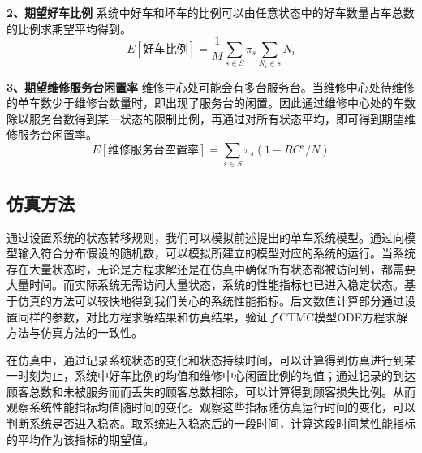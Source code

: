 \documentclass{article}
\begin{document}
\textbf{2、期望好车比例}
系统中好车和坏车的比例可以由任意状态中的好车数量占车总数的比例求期望平均得到。
\begin{equation}
    E[\mbox{好车比例}] = \frac{1}{M} \sum \limits _{s \in S} \pi_{s} \sum \limits _{N_i \in s} N_i 
\end{equation}

\textbf{3、期望维修服务台闲置率}
维修中心处可能会有多台服务台。当维修中心处待维修的单车数少于维修台数量时，即出现了服务台的闲置。因此通过维修中心处的车数除以服务台数得到某一状态的限制比例，再通过对所有状态平均，即可得到期望维修服务台闲置率。
\begin{equation}
E[\mbox{维修服务台空置率}] = \sum \limits _{s \in S} \pi_{s} (1 - RC^s / N)
\end{equation}


\subsection{仿真方法}
通过设置系统的状态转移规则，我们可以模拟前述提出的单车系统模型。通过向模型输入符合分布假设的随机数，可以模拟所建立的模型对应的系统的运行。当系统存在大量状态时，无论是方程求解还是在仿真中确保所有状态都被访问到，都需要大量时间。而实际系统无需访问大量状态，系统的性能指标也已进入稳定状态。基于仿真的方法可以较快地得到我们关心的系统性能指标。后文数值计算部分通过设置同样的参数，对比方程求解结果和仿真结果，验证了CTMC模型ODE方程求解方法与仿真方法的一致性。

在仿真中，通过记录系统状态的变化和状态持续时间，可以计算得到仿真进行到某一时刻为止，系统中好车比例的均值和维修中心闲置比例的均值；通过记录的到达顾客总数和未被服务而而丢失的顾客总数相除，可以计算得到顾客损失比例。从而观察系统性能指标均值随时间的变化。观察这些指标随仿真运行时间的变化，可以判断系统是否进入稳态。取系统进入稳态后的一段时间，计算这段时间某性能指标的平均作为该指标的期望值\cite{welch1983statistical}。
\end{document}
